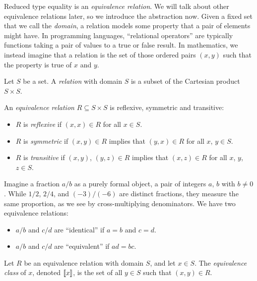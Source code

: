 \documentclass[../generics]{subfiles}
\begin{document}
Reduced type equality is an \emph{equivalence relation}. We will talk about other equivalence relations later, so we introduce the abstraction now. Given a fixed set that we call the \emph{domain}, a relation models some property that a pair of elements might have. In programming languages, ``relational operators'' are typically functions taking a pair of values to a true or false result. In mathematics, we instead imagine that a relation is the set of those ordered pairs $(x,y)$ such that the property is true of $x$ and $y$.

\begin{definition}\label{def relation}
Let $S$ be a set. A \emph{relation} with domain $S$ is a subset of the Cartesian product $S\times S$.
\end{definition}

\begin{definition}
An \emph{equivalence relation} $R\subseteq S\times S$ is reflexive, symmetric and transitive:
\begin{itemize}
\item $R$ is \emph{reflexive} if $(x,x)\in R$ for all $x\in S$.
\item $R$ is \emph{symmetric} if $(x,y)\in R$ implies that $(y,x)\in R$ for all $x$, $y\in S$.
\item $R$ is \emph{transitive} if $(x,y)$, $(y,z)\in R$ implies that $(x,z)\in R$ for all $x$, $y$, $z\in S$.
\end{itemize}
\end{definition}

Imagine a fraction $a/b$ as a purely formal object, a pair of integers $a$, $b$ with $b \neq 0$. While $1/2$, $2/4$, and $(-3)/(-6)$ are distinct fractions, they measure the same proportion, as we see by cross-multiplying denominators. We have two equivalence relations:
\begin{itemize}
\item $a/b$ and $c/d$ are ``identical'' if $a=b$ and $c=d$.
\item $a/b$ and $c/d$ are ``equivalent'' if $ad=bc$.
\end{itemize}

\begin{definition}
Let $R$ be an equivalence relation with domain $S$, and let $x\in S$. The \emph{equivalence class} of $x$, denoted $[\![x]\!]$, is the set of all $y\in S$ such that $(x, y)\in R$.
\end{definition}
\end{document}
